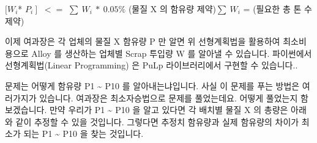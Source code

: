 \documentclass[letterpaper,10pt,english]{jupyterBook}
\begin{document}
\sphinxAtStartPar
\( [ W_i \)* \( P_i  \ ] \) \(\ <= \) \(∑ \ W_i \ * \ 0.05\% \) (물질 X 의 함유량 제약)\( \sum\ W_i \)  =  (필요한 총 톤 수 제약)

\sphinxAtStartPar
이제 여과장은 각 업체의 물질 X 함유량 P 만 알면 위 선형계획법을 활용하여 최소비용으로 Alloy 를 생산하는 업체별 Scrap 투입량  W 를 알아낼 수 있습니다. 파이썬에서 선형계획법(Linear Programming) 은 PuLp 라이브러리에서 구현할 수 있습니다..

\sphinxAtStartPar
문제는 어떻게  함유량 P1 \textasciitilde{} P10 를 알아내는냐입니다. 사실 이 문제를 푸는 방법은 여러가지가 있습니다. 여과장은 최소자승법으로 문제를 풀었는데요. 어떻게 풀었는지 함 보겠습니다.  만약 우리가 P1 \textasciitilde{} P10 을 알고 있다면 각 배치별 물질 X 의 총량은 아래와 같이 추정할 수 있을 것입니다. 그렇다면 추정치 함유량과 실제 함유량의 차이가 최소가 되는 P1 \textasciitilde{} P10 을 찾는 것입니다.









\renewcommand{\indexname}{Index}
\printindex
\end{document}
